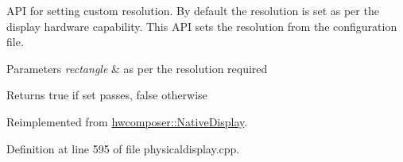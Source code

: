 A\+PI for setting custom resolution. By default the resolution is set as per the display hardware capability. This A\+PI sets the resolution from the configuration file. 
\begin{DoxyParams}{Parameters}
{\em rectangle} & as per the resolution required \\
\hline
\end{DoxyParams}
\begin{DoxyReturn}{Returns}
true if set passes, false otherwise 
\end{DoxyReturn}


Reimplemented from \mbox{\hyperlink{classhwcomposer_1_1NativeDisplay_a8c3c29de10cc3c6e33a90e176d65b003}{hwcomposer\+::\+Native\+Display}}.



Definition at line 595 of file physicaldisplay.\+cpp.


